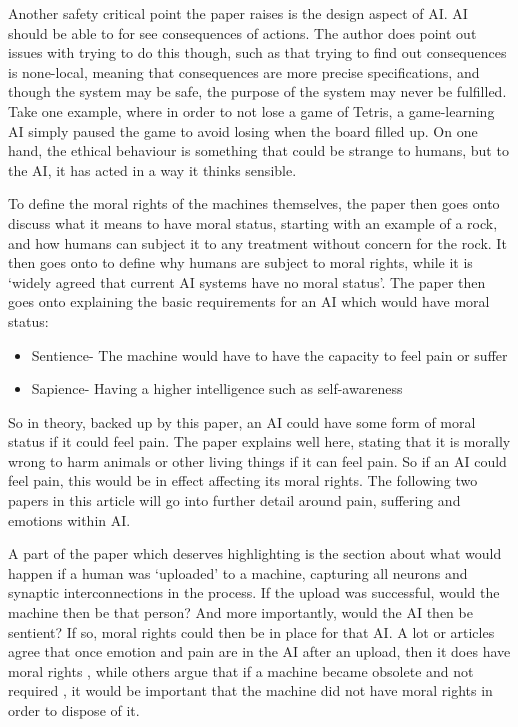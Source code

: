 \documentclass[article]{IEEEtran}
\begin{document}
Another safety critical point the paper raises is the design aspect of AI. AI should be able to for see consequences of actions. The author does point out issues with trying to do this though, such as that trying to find out consequences is none-local, meaning that consequences are more precise specifications, and though the system may be safe, the purpose of the system may never be fulfilled. Take one example, where in order to not lose a game of Tetris, a game-learning AI\cite{tetris} simply paused the game to avoid losing when the board filled up. On one hand, the ethical behaviour is something that could be strange to humans, but to the AI, it has acted in a way it thinks sensible.\par
To define the moral rights of the machines themselves, the paper then goes onto discuss what it means to have moral status, starting with an example of a rock, and how humans can subject it to any treatment without concern for the rock. It then goes onto to define why humans are subject to moral rights, while it is ‘widely agreed that current AI systems have no moral status’. The paper then goes onto explaining the basic requirements for an AI which would have moral status:
\begin{itemize}
\item Sentience- The machine would have to have the capacity to feel pain or suffer
\item Sapience- Having a higher intelligence such as self-awareness
\end{itemize}
So in theory, backed up by this paper, an AI could have some form of moral status if it could feel pain. The paper explains well here, stating that it is morally wrong to harm animals or other living things if it can feel pain. So if an AI could feel pain, this would be in effect affecting its moral rights. The following two papers in this article will go into further detail around pain, suffering and emotions within AI.\par
A part of the paper which deserves highlighting is the section about what would happen if a human was ‘uploaded’ to a machine, capturing all neurons and synaptic interconnections in the process. If the upload was successful, would the machine then be that person? And more importantly, would the AI then be sentient? If so, moral rights could then be in place for that AI. A lot or articles agree that once emotion and pain are in the AI after an upload, then it does have moral rights \cite{rightsTrue}, while others argue that if a machine became obsolete and not required \cite{rightsFalse}, it would be important that the machine did not have moral rights in order to dispose of it. \par
\end{document}
